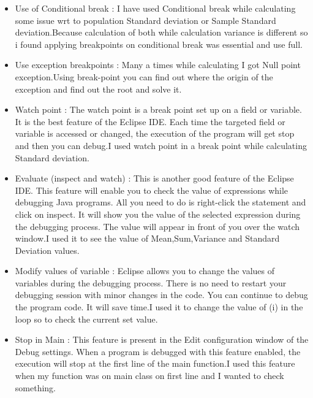 \documentclass{article}
\begin{document}
\begin{itemize}
  \item  Use of Conditional break : I have used Conditional break while calculating some issue wrt to  population Standard deviation or Sample Standard deviation.Because calculation of both while calculation variance is different so i found applying breakpoints on conditional break was essential and use full.
  \item  Use exception breakpoints : Many a times while calculating I got Null point exception.Using break-point you can find out where the origin of the exception and find out the root and solve it. 
  \item  Watch point : The watch point is a break point set up on a field or variable. It is the best feature of the Eclipse IDE. Each time the targeted field or variable is accessed or changed, the execution of the program will get stop and then you can debug.I used watch point in a break point while calculating Standard deviation. 
  \item Evaluate (inspect and watch) : This is another good feature of the Eclipse IDE. This feature will enable you to check the value of expressions while debugging Java programs. All you need to do is right-click the statement and click on inspect. It will show you the value of the selected expression during the debugging process. The value will appear in front of you over the watch window.I used it to see the value of Mean,Sum,Variance and Standard Deviation values.
  \item Modify values of variable : Eclipse allows you to change the values of variables during the debugging process. There is no need to restart your debugging session with minor changes in the code. You can continue to debug the program code. It will save time.I used it to change the value of (i) in the loop so to check the current set value.
  \item Stop in Main : This feature is present in the Edit configuration window of the Debug settings. When a program is debugged with this feature enabled, the execution will stop at the first line of the main function.I used this feature when my function was on main class on first line and I wanted to check something.
\end{itemize}
\end{document}
